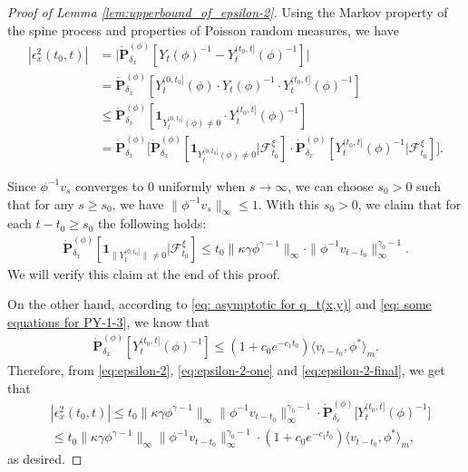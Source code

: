 \documentclass[12pt,a4paper]{amsart}
\theoremstyle{definition}
\numberwithin{equation}{section}
\begin{document}
\begin{proof}
  [Proof of Lemma \ref{lem:upperbound_of_epsilon-2}]
Using the Markov property of the spine process and properties of Poisson random measures, we have
\begin{align}\label{eq:epsilon-2}
	|\epsilon_x^2(t_0,t)|
	&= \big| \dot{\mathbf P}_{\delta_x}^{(\phi)}[Y_t(\phi)^{-1} - Y^{(t_0,t]}_t(\phi)^{-1}] \big|
	\\&= \dot{\mathbf P}_{\delta_x}^{(\phi)}[Y_t^{(0,t_0]}(\phi)\cdot Y_t(\phi)^{-1}\cdot Y^{(t_0,t]}_t(\phi)^{-1}]
	\\&\leq \dot{\mathbf P}_{\delta_x}^{(\phi)}[\mathbf 1_{Y_t^{(0,t_0]}(\phi)\neq 0}\cdot Y^{(t_0,t]}_t(\phi)^{-1}]
	\\&= \dot{\mathbf P}_{\delta_x}^{(\phi)} \big[\dot{\mathbf P}_{\delta_x}^{(\phi)}[\mathbf 1_{Y_t^{(0,t_0]}(\phi)\neq 0}|\mathscr F^\xi_{t_0}] \cdot \dot{\mathbf P}_{\delta_x}^{(\phi)} [ Y^{(t_0,t]}_t(\phi)^{-1}|\mathscr F^\xi_{t_0}] \big].
\end{align}




Since $\phi^{-1}v_s$ converges to $0$ uniformly when $s\to \infty$, we can choose  $s_0>0$ such that for any $s\geq s_0$, we have $\|\phi^{-1}v_s\|_{\infty} \leq 1$.
With this $s_0>0$, we claim that for each $t - t_0\geq s_0$ the following holds:
\begin{align}
  \label{eq:epsilon-2-one}
  \dot{\mathbf P}_{\delta_x}^{(\phi)}[\mathbf 1_{\| Y_t^{(0,t_0]}\|\neq 0}|\mathscr F^\xi_{t_0}]
  \leq t_0\|\kappa \gamma \phi^{\gamma - 1}\|_\infty \cdot \|\phi^{-1}v_{t-t_0}\|^{\gamma_0-1}_\infty.
\end{align}
We will verify this claim at the end of this proof.

On the other hand, according to \eqref{eq: asymptotic for q_t(x,y)} and \eqref{eq: some equations for PY-1-3}, we know that
\begin{align}\label{eq:epsilon-2-final}
	\dot{\mathbf P}_{\delta_x}^{(\phi)}[ Y^{(t_0,t]}_t(\phi)^{-1}]
	\leq (1+c_0 e^{-c_1 t_0}) \langle v_{t-t_0},\phi^* \rangle_m.
\end{align}
Therefore, from \eqref{eq:epsilon-2}, \eqref{eq:epsilon-2-one} and \eqref{eq:epsilon-2-final}, we get that
\begin{align}
&|\epsilon_x^2(t_0,t)|
\leq t_0 \|\kappa \gamma \phi^{\gamma - 1}\|_\infty \|\phi^{-1} v_{t-t_0}\|_\infty^{\gamma_0 - 1} \cdot \dot{\mathbf P}_{\delta_x}^{(\phi)} \big[ Y_t^{(t_0, t]}(\phi)^{-1} \big]
\\ & \leq t_0 \|\kappa \gamma \phi^{\gamma - 1}\|_\infty \|\phi^{-1} v_{t-t_0}\|_\infty^{\gamma_0 - 1} \cdot (1+ c_0 e^{-c_1 t_0})\langle v_{t-t_0}, \phi^* \rangle_m,
\end{align}
as desired.


\end{proof}
\end{document}
